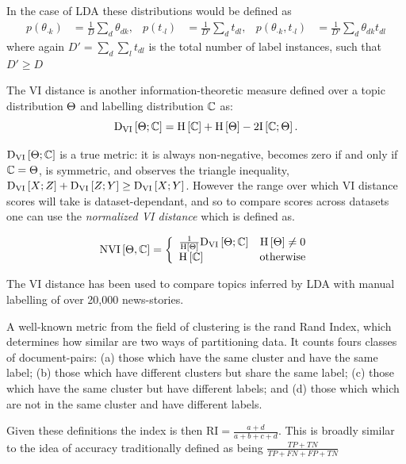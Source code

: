 In the case of LDA these distributions would be defined as
\begin{align}
p(\theta_{\cdot k}) & =  \frac{1}{D} \sum_d \theta_{dk} ,&
p(t_{\cdot l}) &= \frac{1}{D'} \sum_d t_{dl} ,& 
p(\theta_{\cdot k}, t_{\cdot l}) & = \frac{1}{D'} \sum_d \theta_{dk} t_{dl}
\end{align}
where again $D' = \sum_d \sum_l t_{dl}$ is the total number of label instances, such that $D' \geq D$


The VI distance\cite{Meila2003} is another information-theoretic measure defined over a topic distribution $\Theta$ and labelling distribution $\mathbb{C}$ as:
\begin{equation}
\text{D}_\text{VI} \left[ \Theta; \mathbb{C} \right] = \text{H} \left[ \mathbb{C} \right] + \text{H} \left[ \Theta \right] - 2 \text{I} \left[ \mathbb{C} ; \Theta \right].
\end{equation}

$\text{D}_\text{VI} \left[ \Theta; \mathbb{C} \right]$ is a true metric: it is always non-negative, becomes zero if and only if $\mathbb{C} = \Theta$, is symmetric, and observes the triangle inequality, $\text{D}_\text{VI} \left[ X; Z \right] + \text{D}_\text{VI} \left[ Z; Y \right] \geq \text{D}_\text{VI} \left[ X; Y \right]$. However the range over which VI distance scores will take is dataset-dependant, and so to compare scores across datasets one can use the \emph{normalized VI distance}\cite{Reichart2009} which is defined as. 

\begin{align}
\text{NVI}\left[ \Theta, \mathbb{C} \right] = \left\{ \begin{array}{lr}
     \frac{1}{\text{H} \left[ \Theta \right]}\text{D}_\text{VI} \left[ \Theta; \mathbb{C} \right] & \text{H} \left[ \Theta \right] \neq 0 \\
     \text{H} \left[ \mathbb{C} \right] & \text{otherwise}
 \end{array}\right.
\end{align}


The VI distance has been used to compare topics inferred by LDA with manual labelling of over 20,000 news-stories\cite{HeinrichEtAl2005}. 


A well-known metric from the field of clustering is the rand Rand Index, which determines how similar are two ways of partitioning data. It counts fours classes of document-pairs: (a) those which have the same cluster and have the same label; (b) those which have different clusters but share the same label; (c) those which have the same cluster but have different labels; and (d) those which which are not in the same cluster and have different labels.

Given these definitions the index is then $\text{RI} = \frac{a + d}{a + b + c + d}$. This is broadly similar to the idea of accuracy traditionally defined as being $\frac{TP + TN}{TP + FN + FP + TN}$

